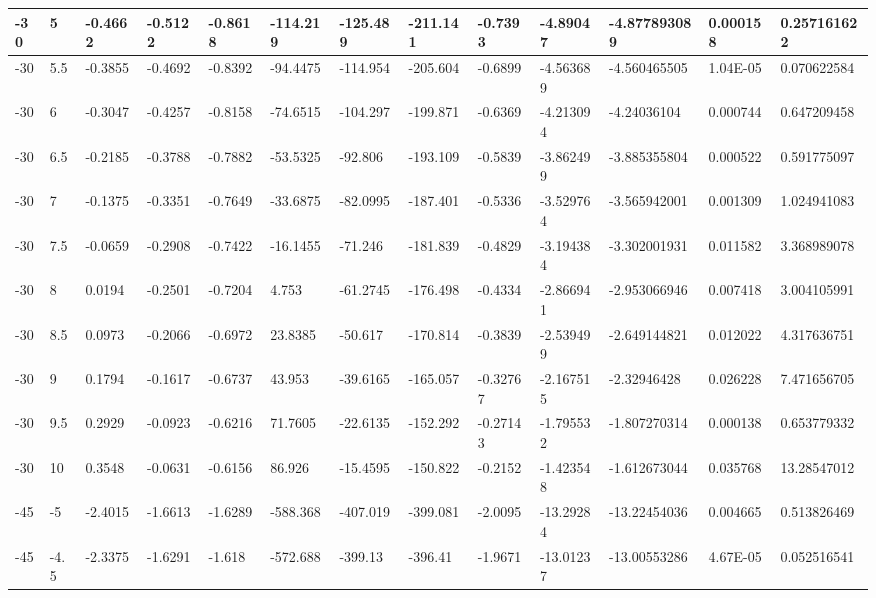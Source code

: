 \begin{longtable}{|l|l|l|l|l|l|l|l|l|l|l|l|l|}
-30   & 5     & -0.4662 & -0.5122 & -0.8618 & -114.219 & -125.489 & -211.141 & -0.7393  & -4.89047    & -4.877893089   & 0.000158                 & 0.257161622 \\ \hline
-30   & 5.5   & -0.3855 & -0.4692 & -0.8392 & -94.4475 & -114.954 & -205.604 & -0.6899  & -4.563689   & -4.560465505   & 1.04E-05                 & 0.070622584 \\ \hline
-30   & 6     & -0.3047 & -0.4257 & -0.8158 & -74.6515 & -104.297 & -199.871 & -0.6369  & -4.213094   & -4.24036104    & 0.000744                 & 0.647209458 \\ \hline
-30   & 6.5   & -0.2185 & -0.3788 & -0.7882 & -53.5325 & -92.806  & -193.109 & -0.5839  & -3.862499   & -3.885355804   & 0.000522                 & 0.591775097 \\ \hline
-30   & 7     & -0.1375 & -0.3351 & -0.7649 & -33.6875 & -82.0995 & -187.401 & -0.5336  & -3.529764   & -3.565942001   & 0.001309                 & 1.024941083 \\ \hline
-30   & 7.5   & -0.0659 & -0.2908 & -0.7422 & -16.1455 & -71.246  & -181.839 & -0.4829  & -3.194384   & -3.302001931   & 0.011582                 & 3.368989078 \\ \hline
-30   & 8     & 0.0194  & -0.2501 & -0.7204 & 4.753    & -61.2745 & -176.498 & -0.4334  & -2.866941   & -2.953066946   & 0.007418                 & 3.004105991 \\ \hline
-30   & 8.5   & 0.0973  & -0.2066 & -0.6972 & 23.8385  & -50.617  & -170.814 & -0.3839  & -2.539499   & -2.649144821   & 0.012022                 & 4.317636751 \\ \hline
-30   & 9     & 0.1794  & -0.1617 & -0.6737 & 43.953   & -39.6165 & -165.057 & -0.32767 & -2.167515   & -2.32946428    & 0.026228                 & 7.471656705 \\ \hline
-30   & 9.5   & 0.2929  & -0.0923 & -0.6216 & 71.7605  & -22.6135 & -152.292 & -0.27143 & -1.795532   & -1.807270314   & 0.000138                 & 0.653779332 \\ \hline
-30   & 10    & 0.3548  & -0.0631 & -0.6156 & 86.926   & -15.4595 & -150.822 & -0.2152  & -1.423548   & -1.612673044   & 0.035768                 & 13.28547012 \\ \hline
-45   & -5    & -2.4015 & -1.6613 & -1.6289 & -588.368 & -407.019 & -399.081 & -2.0095  & -13.29284   & -13.22454036   & 0.004665                 & 0.513826469 \\ \hline
-45   & -4.5  & -2.3375 & -1.6291 & -1.618  & -572.688 & -399.13  & -396.41  & -1.9671  & -13.01237   & -13.00553286   & 4.67E-05                 & 0.052516541 \\ \hline

\end{longtable}
